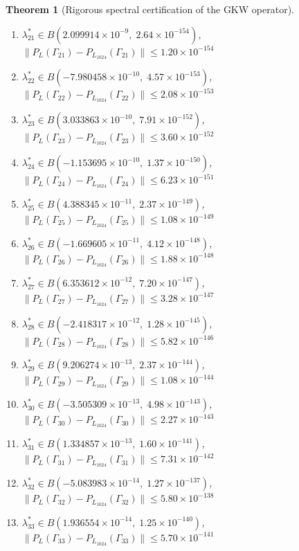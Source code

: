 \documentclass[11pt]{article}
\newtheorem{theorem}{Theorem}
\begin{document}
\begin{theorem}[Rigorous spectral certification of the GKW operator]
\begin{enumerate}
\item $\lambda_{21}^* \in B(2.099914 \times 10^{-9},\; 2.64 \times 10^{-154})$, \quad $\|P_L(\Gamma_{21}) - P_{L_{1024}}(\Gamma_{21})\| \leq 1.20 \times 10^{-154}$
\item $\lambda_{22}^* \in B(-7.980458 \times 10^{-10},\; 4.57 \times 10^{-153})$, \quad $\|P_L(\Gamma_{22}) - P_{L_{1024}}(\Gamma_{22})\| \leq 2.08 \times 10^{-153}$
\item $\lambda_{23}^* \in B(3.033863 \times 10^{-10},\; 7.91 \times 10^{-152})$, \quad $\|P_L(\Gamma_{23}) - P_{L_{1024}}(\Gamma_{23})\| \leq 3.60 \times 10^{-152}$
\item $\lambda_{24}^* \in B(-1.153695 \times 10^{-10},\; 1.37 \times 10^{-150})$, \quad $\|P_L(\Gamma_{24}) - P_{L_{1024}}(\Gamma_{24})\| \leq 6.23 \times 10^{-151}$
\item $\lambda_{25}^* \in B(4.388345 \times 10^{-11},\; 2.37 \times 10^{-149})$, \quad $\|P_L(\Gamma_{25}) - P_{L_{1024}}(\Gamma_{25})\| \leq 1.08 \times 10^{-149}$
\item $\lambda_{26}^* \in B(-1.669605 \times 10^{-11},\; 4.12 \times 10^{-148})$, \quad $\|P_L(\Gamma_{26}) - P_{L_{1024}}(\Gamma_{26})\| \leq 1.88 \times 10^{-148}$
\item $\lambda_{27}^* \in B(6.353612 \times 10^{-12},\; 7.20 \times 10^{-147})$, \quad $\|P_L(\Gamma_{27}) - P_{L_{1024}}(\Gamma_{27})\| \leq 3.28 \times 10^{-147}$
\item $\lambda_{28}^* \in B(-2.418317 \times 10^{-12},\; 1.28 \times 10^{-145})$, \quad $\|P_L(\Gamma_{28}) - P_{L_{1024}}(\Gamma_{28})\| \leq 5.82 \times 10^{-146}$
\item $\lambda_{29}^* \in B(9.206274 \times 10^{-13},\; 2.37 \times 10^{-144})$, \quad $\|P_L(\Gamma_{29}) - P_{L_{1024}}(\Gamma_{29})\| \leq 1.08 \times 10^{-144}$
\item $\lambda_{30}^* \in B(-3.505309 \times 10^{-13},\; 4.98 \times 10^{-143})$, \quad $\|P_L(\Gamma_{30}) - P_{L_{1024}}(\Gamma_{30})\| \leq 2.27 \times 10^{-143}$
\item $\lambda_{31}^* \in B(1.334857 \times 10^{-13},\; 1.60 \times 10^{-141})$, \quad $\|P_L(\Gamma_{31}) - P_{L_{1024}}(\Gamma_{31})\| \leq 7.31 \times 10^{-142}$
\item $\lambda_{32}^* \in B(-5.083983 \times 10^{-14},\; 1.27 \times 10^{-137})$, \quad $\|P_L(\Gamma_{32}) - P_{L_{1024}}(\Gamma_{32})\| \leq 5.80 \times 10^{-138}$
\item $\lambda_{33}^* \in B(1.936554 \times 10^{-14},\; 1.25 \times 10^{-140})$, \quad $\|P_L(\Gamma_{33}) - P_{L_{1024}}(\Gamma_{33})\| \leq 5.70 \times 10^{-141}$

\end{enumerate}
\end{theorem}
\end{document}
